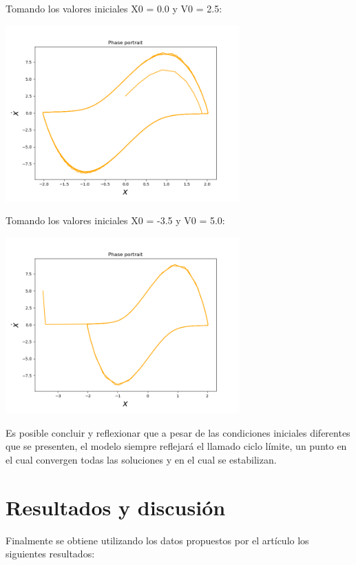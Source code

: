 \documentclass{article} %
\begin{document}
Tomando los valores iniciales X0 = 0.0 y V0 = 2.5: 

\begin{center}
	\includegraphics[width=9cm]{php3.png}
\end{center}

Tomando los valores iniciales X0 = -3.5 y V0 = 5.0: 

\begin{center}
	\includegraphics[width=9cm]{php4.png}
\end{center}

Es posible concluir y reflexionar que a pesar de las condiciones iniciales diferentes que se presenten, el modelo siempre reflejará el llamado ciclo límite, un punto en el cual convergen todas las soluciones y en el cual se estabilizan. 

\section{Resultados y discusión}

Finalmente se obtiene utilizando los datos propuestos por el artículo los siguientes resultados:

\vspace{0.5 cm}
\end{document}
